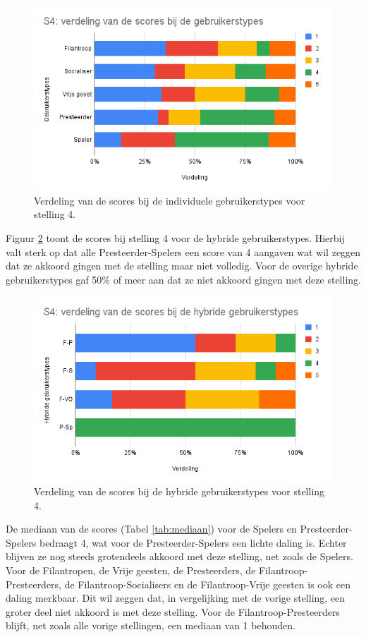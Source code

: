 \begin{figure}
    \includegraphics[width=\linewidth]{S4.png}
    \caption{Verdeling van de scores bij de individuele gebruikerstypes voor stelling 4.}
    \label{fig:s4}
\end{figure}

Figuur \ref{fig:s4_hybride} toont de scores bij stelling 4 voor de hybride gebruikerstypes. Hierbij valt sterk op dat alle Presteerder-Spelers een score van 4 aangaven wat wil zeggen dat ze akkoord gingen met de stelling maar niet volledig. Voor de overige hybride gebruikerstypes gaf 50\% of meer aan dat ze niet akkoord gingen met deze stelling.

\begin{figure}
    \includegraphics[width=\linewidth]{S4_Hybride.png}
    \caption{Verdeling van de scores bij de hybride gebruikerstypes voor stelling 4.}
    \label{fig:s4_hybride}
\end{figure}

De mediaan van de scores (Tabel \ref{tab:mediaan}) voor de Spelers en Presteerder-Spelers bedraagt 4, wat voor de Presteerder-Spelers een lichte daling is. Echter blijven ze nog steeds grotendeels akkoord met deze stelling, net zoals de Spelers. Voor de Filantropen, de Vrije geesten, de Presteerders, de Filantroop-Presteerders, de Filantroop-Socialisers en de Filantroop-Vrije geesten is ook een daling merkbaar. Dit wil zeggen dat, in vergelijking met de vorige stelling, een groter deel niet akkoord is met deze stelling. Voor de Filantroop-Presteerders blijft, net zoals alle vorige stellingen, een mediaan van 1 behouden.

